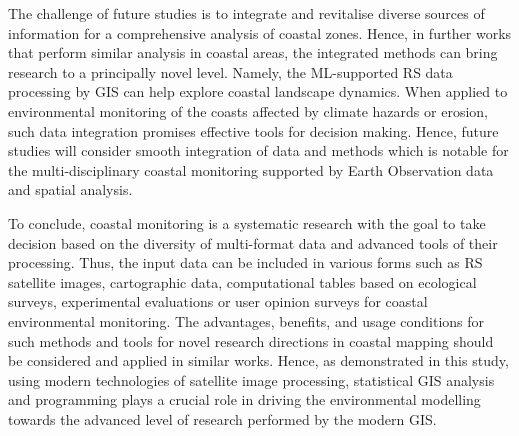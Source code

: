 \documentclass[jmse,article,submit,pdftex,moreauthors]{Definitions/mdpi}
\begin{document}
The challenge of future studies is to integrate and revitalise diverse sources of information for a comprehensive analysis of coastal zones. Hence, in further works that perform similar analysis in coastal areas, the integrated methods can bring research to a principally novel level. Namely, the ML-supported RS data processing by GIS can help explore coastal landscape dynamics. When applied to environmental monitoring of the coasts affected by climate hazards or erosion, such data integration promises effective tools for decision making. Hence, future studies will consider smooth integration of data and methods which is notable for the multi-disciplinary coastal monitoring supported by Earth Observation data and spatial analysis. 

To conclude, coastal monitoring is a systematic research with the goal to take decision based on the diversity of multi-format data and advanced tools of their processing. Thus, the input data can be included in various forms such as RS satellite images, cartographic data, computational tables based on ecological surveys, experimental evaluations or user opinion surveys for coastal environmental monitoring. The advantages, benefits, and usage conditions for such methods and tools for novel research directions in coastal mapping should be considered and applied in similar works. Hence, as demonstrated in this study, using modern technologies of satellite image processing, statistical GIS analysis and programming plays a crucial role in driving the environmental modelling towards the advanced level of research performed by the modern GIS. 





\end{document}
